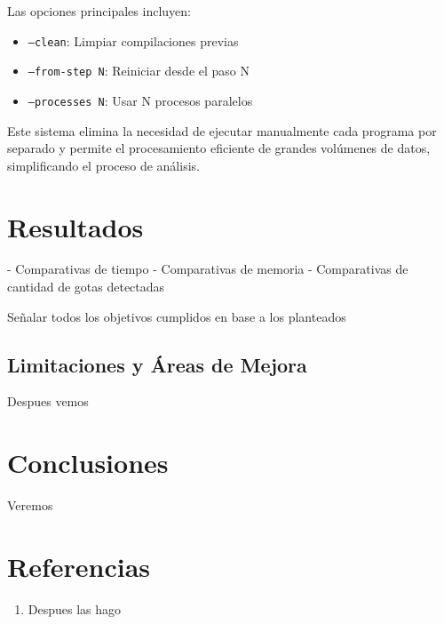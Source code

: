\documentclass[12pt,a4paper]{article}
\begin{document}
Las opciones principales incluyen:
\begin{itemize}
    \item \texttt{--clean}: Limpiar compilaciones previas
    \item \texttt{--from-step N}: Reiniciar desde el paso N
    \item \texttt{--processes N}: Usar N procesos paralelos
\end{itemize}

Este sistema elimina la necesidad de ejecutar manualmente cada programa por separado y permite el procesamiento eficiente de grandes volúmenes de datos, simplificando el proceso de análisis.

\section{Resultados}

- Comparativas de tiempo
- Comparativas de memoria
- Comparativas de cantidad de gotas detectadas

Señalar todos los objetivos cumplidos en base a los planteados

\subsection{Limitaciones y Áreas de Mejora}
\lhead{}

Despues vemos

\section{Conclusiones}

Veremos 

\section{Referencias}

\begin{enumerate}
    \item Despues las hago
\end{enumerate}
\end{document}
